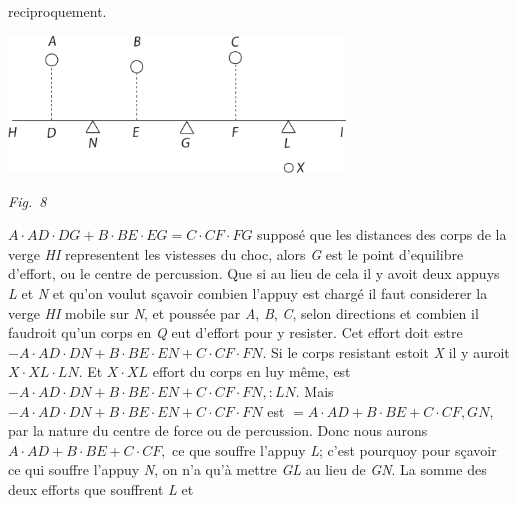 reciproquement. %
\pend
%
\vspace{1.5em}
\centerline{\includegraphics[width=0.67\textwidth]{gesamttex/edit_VIII,3/images/LH_38_212-215_d8_214r.pdf}}
\vspace{0.5em}
\centerline{\lbrack\textit{Fig.~8}\rbrack}
\vspace{1.0em}
%
\pstart
{}
%
$A\cdot AD \cdot DG+B\cdot BE \cdot EG = C\cdot CF \cdot FG$ supposé que les distances des corps 
%
de la verge \textit{HI} representent les vistesses du choc, alors \textit{G} est le point 
%
d'equilibre\protect{} d'effort, ou le centre de 
%
percussion\protect{}. Que si au lieu de cela il y avoit deux 
%
appuys \textit{L} et \textit{N} et qu'on voulut sçavoir combien l'appuy est chargé il faut considerer la verge
%
\textit{HI} mobile sur \textit{N}, et poussée par \textit{A}, \textit{B}, \textit{C}, selon
%
%
directions et combien il faudroit qu'un corps en \textit{Q} eut d'effort pour y resister. 
%
Cet effort doit estre $-A\cdot AD\cdot DN+B\cdot BE\cdot EN+C\cdot CF\cdot FN$. 
%
Si le corps resistant estoit \textit{X} il y auroit $X\cdot XL\cdot LN$. 
%
Et $X\cdot XL$ effort du corps en luy même, est 
%
$-A\cdot AD\cdot DN+B\cdot BE\cdot EN+C\cdot CF\cdot FN,:LN$. 
%
Mais $-A\cdot AD\cdot DN+B\cdot BE\cdot EN +C\cdot CF\cdot FN$ 
%
est $=A\cdot AD+B\cdot BE+C\cdot CF, GN$, par la nature du centre de force\protect{} ou de
%
percussion.\protect{} Donc nous aurons
%
$A\cdot AD+B\cdot BE+C\cdot CF,$
%
%
ce que souffre l'appuy \textit{L}; c'est pourquoy pour sçavoir ce qui souffre l'appuy \textit{N}, 
%
on n'a qu'à mettre \textit{GL} au lieu de \textit{GN}. La somme des deux efforts que souffrent \textit{L} et 
